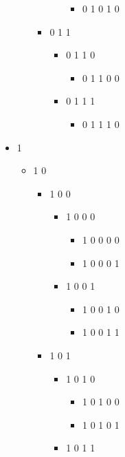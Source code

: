 \begin{itemize}
\begin{itemize}
\begin{itemize}
\begin{itemize}
\begin{itemize}
\item 0 1 0 1 0
\end{itemize}
\end{itemize}
\item 0 1 1 


\begin{itemize}
\item 0 1 1 0 


\begin{itemize}
\item 0 1 1 0 0
\end{itemize}
\item 0 1 1 1 


\begin{itemize}
\item 0 1 1 1 0
\end{itemize}
\end{itemize}
\end{itemize}
\end{itemize}
\item 1 


\begin{itemize}
\item 1 0 


\begin{itemize}
\item 1 0 0 


\begin{itemize}
\item 1 0 0 0 


\begin{itemize}
\item 1 0 0 0 0 
\item 1 0 0 0 1
\end{itemize}
\item 1 0 0 1 


\begin{itemize}
\item 1 0 0 1 0 
\item 1 0 0 1 1
\end{itemize}
\end{itemize}
\item 1 0 1 


\begin{itemize}
\item 1 0 1 0 


\begin{itemize}
\item 1 0 1 0 0 
\item 1 0 1 0 1
\end{itemize}
\item 1 0 1 1 



\end{itemize}
\end{itemize}
\end{itemize}
\end{itemize}
